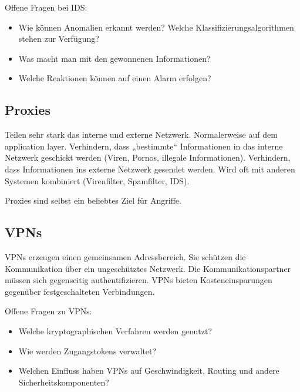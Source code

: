 Offene Fragen bei IDS:
\begin{itemize}
  \item Wie können Anomalien erkannt werden? Welche Klassifizierungsalgorithmen stehen zur
    Verfügung?
  \item Was macht man mit den gewonnenen Informationen?
  \item Welche Reaktionen können auf einen Alarm erfolgen?
\end{itemize}

\subsection{Proxies}%
\label{sub:proxies}

Teilen sehr stark das interne und externe Netzwerk.
Normalerweise auf dem application layer.
Verhindern, dass „bestimmte“ Informationen in das interne Netzwerk geschickt werden
(Viren, Pornos, illegale Informationen).
Verhindern, dass Informationen ins externe Netzwerk gesendet werden.
Wird oft mit anderen Systemen kombiniert (Virenfilter, Spamfilter, IDS).

Proxies sind selbst ein beliebtes Ziel für Angriffe.

\subsection{VPNs}%
\label{sub:vpns}

VPNs erzeugen einen gemeinsamen Adressbereich.
Sie schützen die Kommunikation über ein ungeschütztes Netzwerk.
Die Kommunikationspartner müssen sich gegenseitig authentifizieren.
VPNs bieten Kosteneinsparungen gegenüber festgeschalteten Verbindungen.

Offene Fragen zu VPNs:
\begin{itemize}
  \item Welche kryptographischen Verfahren werden genutzt?
  \item Wie werden Zugangstokens verwaltet?
  \item Welchen Einfluss haben VPNs auf Geschwindigkeit, Routing und andere
    Sicherheitskomponenten?
\end{itemize}
